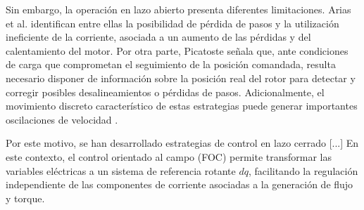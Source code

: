%
%
%
%
%
%

Sin embargo, la operación en lazo abierto presenta diferentes limitaciones. Arias et al. \cite{ariasReducingCoggingTorque2019} identifican entre ellas la posibilidad de pérdida de pasos y la utilización ineficiente de la corriente, asociada a un aumento de las pérdidas y del calentamiento del motor. Por otra parte, Picatoste \cite{picatosteruilopeModellingControlStepper2014} señala que, ante condiciones de carga que comprometan el seguimiento de la posición comandada, resulta necesario disponer de información sobre la posición real del rotor para detectar y corregir posibles desalineamientos o pérdidas de pasos. Adicionalmente, el movimiento discreto característico de estas estrategias puede generar importantes oscilaciones de velocidad \cite{picatosteruilopeModellingControlStepper2014}.


%
%
%
%

Por este motivo, se han desarrollado estrategias de control en lazo cerrado [...] En este contexto, el control orientado al campo (FOC) permite transformar las variables eléctricas a un sistema de referencia rotante \(dq\), facilitando la regulación independiente de las componentes de corriente asociadas a la generación de flujo y torque.

